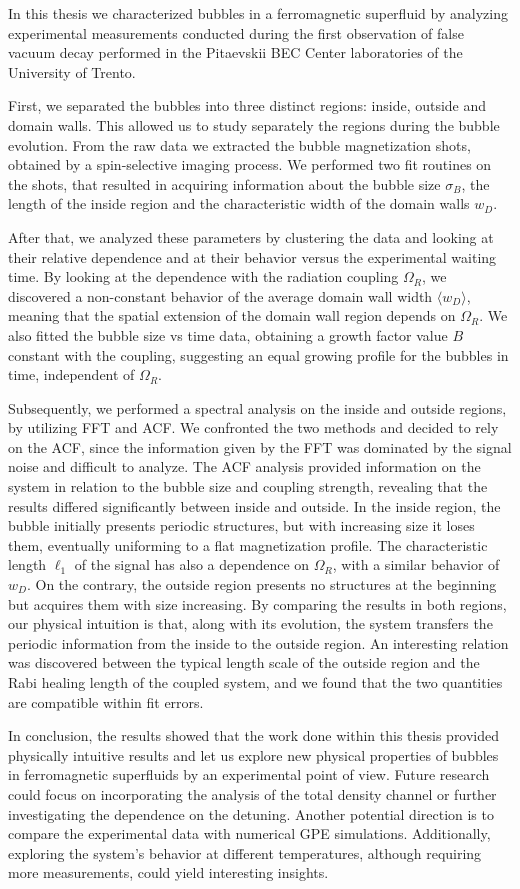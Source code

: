 In this thesis we characterized bubbles in a ferromagnetic superfluid by analyzing experimental measurements conducted during the first observation of false vacuum decay performed in the Pitaevskii BEC Center laboratories of the University of Trento. 

First, we separated the bubbles into three distinct regions: inside, outside and domain walls. This allowed us to study separately the regions during the bubble evolution. From the raw data we extracted the bubble magnetization shots, obtained by a spin-selective imaging process. We performed two fit routines on the shots, that resulted in acquiring information about the bubble size $\sigma_B$, the length of the inside region and the characteristic width of the domain walls $w_D$. 

After that, we analyzed these parameters by clustering the data and looking at their relative dependence and at their behavior versus the experimental waiting time. By looking at the dependence with the radiation coupling $\Omega_R$, we discovered a non-constant behavior of the average domain wall width $\langle w_D\rangle$, meaning that the spatial extension of the domain wall region depends on $\Omega_R$. We also fitted the bubble size vs time data, obtaining a growth factor value $B$ constant with the coupling, suggesting an equal growing profile for the bubbles in time, independent of $\Omega_R$.

Subsequently, we performed a spectral analysis on the inside and outside regions, by utilizing FFT and ACF. We confronted the two methods and decided to rely on the ACF, since the information given by the FFT was dominated by the signal noise and difficult to analyze. 
The ACF analysis provided information on the system in relation to the bubble size and coupling strength, revealing that the results differed significantly between inside and outside.
In the inside region, the bubble initially presents periodic structures, but with increasing size it loses them, eventually uniforming to a flat magnetization profile. The characteristic length $\ell_1$ of the signal has also a dependence on $\Omega_R$, with a similar behavior of $w_D$. On the contrary, the outside region presents no structures at the beginning but acquires them with size increasing. By comparing the results in both regions, our physical intuition is that, along with its evolution, the system transfers the periodic information from the inside to the outside region. An interesting relation was discovered between the typical length scale of the outside region and the Rabi healing length of the coupled system, and we found that the two quantities are compatible within fit errors.

In conclusion, the results showed that the work done within this thesis provided physically intuitive results and let us explore new physical properties of bubbles in ferromagnetic superfluids by an experimental point of view. 
Future research could focus on incorporating the analysis of the total density channel or further investigating the dependence on the detuning. Another potential direction is to compare the experimental data with numerical GPE simulations. Additionally, exploring the system's behavior at different temperatures, although requiring more measurements, could yield interesting insights.
